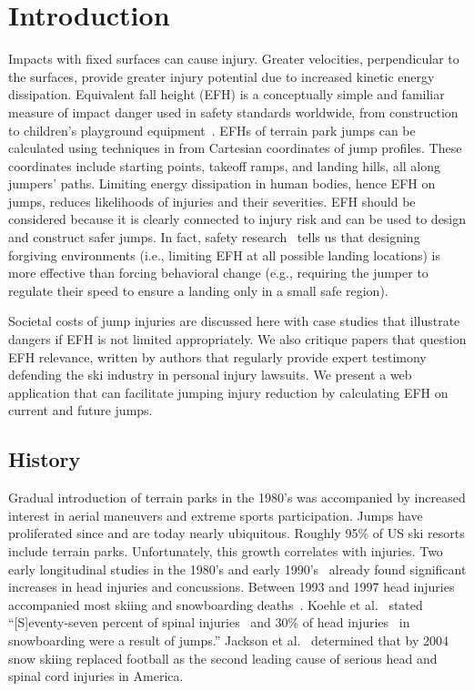 \documentclass{article}
\begin{document}
\section{Introduction}
\label{intro}
%
Impacts with fixed surfaces can cause injury. Greater velocities, perpendicular
to the surfaces, provide greater injury potential due to increased kinetic
energy dissipation. Equivalent fall height (EFH) is a conceptually simple and
familiar measure of impact danger used in safety standards worldwide, from
construction~\cite{OSHA2021} to children's playground
equipment~\cite{Chalmers1996}. EFHs of terrain park jumps can be calculated
using techniques in \cite{Levy2015} from Cartesian coordinates of jump
profiles. These coordinates include starting points, takeoff ramps, and landing
hills, all along jumpers' paths. Limiting energy dissipation in human bodies,
hence EFH on jumps, reduces likelihoods of injuries and their severities. EFH
should be considered because it is clearly connected to injury risk and can be
used to design and construct safer jumps. In fact, safety
research~\cite{Smith2020} tells us that designing forgiving environments (i.e.,
limiting EFH at all possible landing locations) is more effective than forcing
behavioral change (e.g., requiring the jumper to regulate their speed to ensure
a landing only in a small safe region).

Societal costs of jump injuries are discussed here with case studies that
illustrate dangers if EFH is not limited appropriately. We also critique papers
that question EFH relevance, written by authors that regularly provide expert
testimony defending the ski industry in personal injury lawsuits. We present a
web application that can facilitate jumping injury reduction by calculating EFH
on current and future jumps.

\subsection{History}
\label{sec:hist}
%
Gradual introduction of terrain parks in the 1980's was accompanied by
increased interest in aerial maneuvers and extreme sports participation. Jumps
have proliferated since and are today nearly ubiquitous.  Roughly 95\% of US
ski resorts include terrain parks. Unfortunately, this growth correlates with
injuries. Two early longitudinal studies in the 1980's and early
1990's~\cite{Deibert1998,Furrer1995} already found significant increases in
head injuries and concussions. Between 1993 and 1997 head injuries accompanied
most skiing and snowboarding deaths~\cite{CPSC1999}. Koehle et
al.~\cite{Koehle2002} stated ``[S]eventy-seven percent of spinal
injuries~\cite{Tarazi1999} and 30\% of head injuries~\cite{Fukuda2001} in
snowboarding were a result of jumps.'' Jackson et al.~\cite{Jackson2004}
determined that by 2004 snow skiing replaced football as the second leading
cause of serious head and spinal cord injuries in America.
\end{document}
